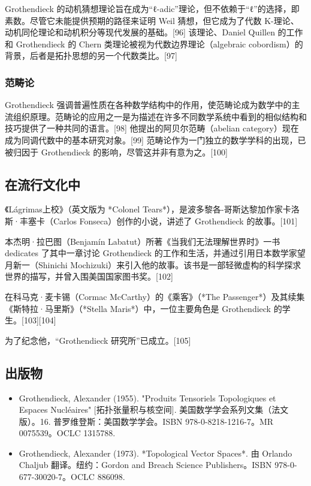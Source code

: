 Grothendieck 的动机猜想理论旨在成为“ℓ-adic”理论，但不依赖于“ℓ”的选择，即素数。尽管它未能提供预期的路径来证明 Weil 猜想，但它成为了代数 K-理论、动机同伦理论和动机积分等现代发展的基础。[96] 该理论、Daniel Quillen 的工作和 Grothendieck 的 Chern 类理论被视为代数边界理论（algebraic cobordism）的背景，后者是拓扑思想的另一个代数类比。[97]
\subsubsection{范畴论}  
Grothendieck 强调普遍性质在各种数学结构中的作用，使范畴论成为数学中的主流组织原理。范畴论的应用之一是为描述在许多不同数学系统中看到的相似结构和技巧提供了一种共同的语言。[98] 他提出的阿贝尔范畴（abelian category）现在成为同调代数中的基本研究对象。[99] 范畴论作为一门独立的数学学科的出现，已被归因于 Grothendieck 的影响，尽管这并非有意为之。[100]
\subsection{在流行文化中}  
《Lágrimas上校》（英文版为 *Colonel Tears*），是波多黎各-哥斯达黎加作家卡洛斯·丰塞卡（Carlos Fonseca）创作的小说，讲述了 Grothendieck 的故事。[101]  

本杰明·拉巴图（Benjamín Labatut）所著《当我们无法理解世界时》一书 dedicates 了其中一章讨论 Grothendieck 的工作和生活，并通过引用日本数学家望月新一（Shinichi Mochizuki）来引入他的故事。该书是一部轻微虚构的科学探求世界的描写，并曾入围美国国家图书奖。[102]  

在科马克·麦卡锡（Cormac McCarthy）的《乘客》（*The Passenger*）及其续集《斯特拉·马里斯》（*Stella Maris*）中，一位主要角色是 Grothendieck 的学生。[103][104]  

为了纪念他，“Grothendieck 研究所”已成立。[105]
\subsection{出版物}  
\begin{itemize}
\item Grothendieck, Alexander (1955). "Produits Tensoriels Topologiques et Espaces Nucléaires" [拓扑张量积与核空间]. 美国数学学会系列文集（法文版）。16. 普罗维登斯：美国数学学会。ISBN 978-0-8218-1216-7。MR 0075539。OCLC 1315788.  
\item Grothendieck, Alexander (1973). *Topological Vector Spaces*. 由 Orlando Chaljub 翻译。纽约：Gordon and Breach Science Publishers。ISBN 978-0-677-30020-7。OCLC 886098. 
\end{itemize} 

